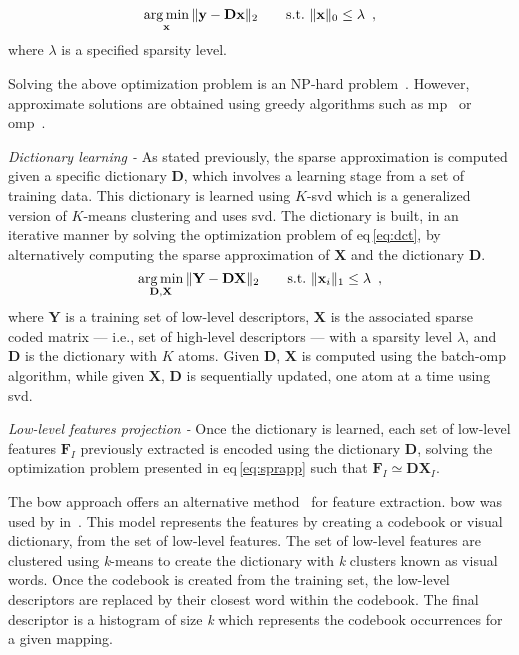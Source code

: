 \begin{equation}
  \operatorname*{arg\,min}_{\mathbf{x}}\|\mathbf{y - Dx} \|_{2} \qquad  \text{s.t.} \  \|\mathbf{x}\|_{0} \leq \lambda \, \label{eq:sprapp} \ ,
\end{equation}
\noindent where $\lambda$ is a specified sparsity level.

Solving the above optimization problem is an NP-hard
problem~\cite{elad2010sparse}.
However, approximate solutions are obtained using greedy algorithms such as
\ac{mp}~\cite{mallat1993matching} or
\ac{omp}~\cite{pati1993orthogonal,davis1997adaptive}.

\emph{Dictionary learning -} As stated previously, the sparse approximation is
computed given a specific dictionary $\mathbf{D}$, which involves a learning
stage from a set of training data.
This dictionary is learned using $K$-\acs*{svd} which is a generalized version
of $K$-means clustering and uses \ac{svd}.
The dictionary is built, in an iterative manner by solving the optimization
problem of \acs{eq}\,\eqref{eq:dct}, by alternatively computing the sparse
approximation of $\mathbf{X}$ and the dictionary $\mathbf{D}$.
\begin{equation}
  \operatorname*{arg\,min}_{\mathbf{D,X}} \|\mathbf{Y} - \mathbf{D}\mathbf{X}\|_{2} \qquad  \text{s.t.} \  \|\mathbf{x}_{i}\|_{1} \leq \lambda \,\label{eq:dct} \ ,
\end{equation}
\noindent where $\mathbf{Y}$ is a training set of low-level descriptors,
$\mathbf{X}$ is the associated sparse coded matrix --- i.e., set of high-level
descriptors --- with a sparsity level $\lambda$, and $\mathbf{D}$ is the
dictionary with $K$ atoms.
Given $\mathbf{D}$, $\mathbf{X}$ is computed using the batch-\ac{omp}
algorithm, while given $\mathbf{X}$, $\mathbf{D}$ is sequentially updated, one
atom at a time using \ac{svd}.

\emph{Low-level features projection -} Once the dictionary is learned, each set
of low-level features $\mathbf{F}_{I}$ previously extracted is encoded using
the dictionary $\mathbf{D}$, solving the optimization problem presented in
\acs{eq}\,\eqref{eq:sprapp} such that $\mathbf{F}_{I} \simeq \mathbf{DX}_{I}$.

The \ac{bow} approach offers an alternative method~\cite{Sivic2003} for feature
extraction.
\Ac{bow} was used by \citeauthor{rampun2016computerb}
in~\cite{rampun2015classifying,rampun2016computerb}.
This model represents the features by creating a codebook or visual dictionary,
from the set of low-level features.
The set of low-level features are clustered using \textit{k}-means to create
the dictionary with \textit{k} clusters known as visual words.
Once the codebook is created from the training set, the low-level descriptors
are replaced by their closest word within the codebook.
The final descriptor is a histogram of size \textit{k} which represents the
codebook occurrences for a given mapping.

